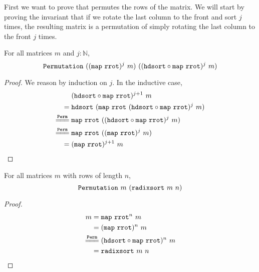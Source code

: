 \documentclass[sigplan,10pt,anonymous,review]{thesis}
\begin{document}
First we want to prove that  permutes the rows of the
matrix. We will start by proving the invariant that if we rotate the
last column to the front and sort $j$ times, the resulting matrix is a
permutation of simply rotating the last column to the front $j$
times.
\begin{lemma}
  For all matrices $m$ and $j : \mathbb{N}$,
  \begin{equation*}
    \texttt{\textup{Permutation}}~((\texttt{\textup{map}}~\texttt{\textup{rrot}})^j~m)~
                      ((\texttt{\textup{hdsort}} \circ \texttt{\textup{map}}~\texttt{\textup{rrot}})^j~m)
  \end{equation*}
\end{lemma}
\begin{proof}
  We reason by induction on $j$. In the inductive case,
  \begin{align*}
     {}& (\var{hdsort} \comp \var{map}~\var{rrot})^{j+1}~m \\
    ={}& \var{hdsort}~(\var{map}~\var{rrot}~(\var{hdsort} \comp
         \var{map}~\var{rrot})^j~m) \\
    \eqperm{}& \var{map}~\var{rrot}~((\var{hdsort} \comp
      \var{map}~\var{rrot})^j~m) \\
    \eqperm{}& \var{map}~\var{rrot}~((\var{map}~\var{rrot})^j~m) \\
    ={}& (\var{map}~\var{rrot})^{j+1}~m \qedhere
  \end{align*}
\end{proof}

\begin{theorem}
  For all matrices $m$ with rows of length $n$,
  \begin{equation*}
    \texttt{\textup{Permutation}}~m~(\texttt{\textup{radixsort}}~m~n)
  \end{equation*}
\end{theorem}
\begin{proof}
  \begin{align*}
    m ={}&
    \var{map}~\var{rrot}^n~m \\
    ={}& (\var{map}~\var{rrot})^n~m \\
    \eqperm{}& (\var{hdsort} \comp \var{map}~\var{rrot})^n~m \\
    ={}& \var{radixsort}~m~n \qedhere
  \end{align*}
\end{proof}
\end{document}
